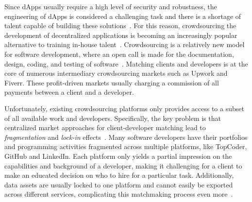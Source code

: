 Since dApps usually require a high level of security and robustness, the engineering of dApps is considered a challenging task and there is a shortage of talent capable of building these solutions~\cite{shortage2016nasdaq}.
For this reason, crowdsourcing the development of decentralized applications is becoming an increasingly popular alternative to training in-house talent~\cite{gong2021reference}.
Crowdsourcing is a relatively new model for software development, where an open call is made for the documentation, design, coding, and testing of software~\cite{latoza2016crowdsourcing}.
Matching clients and developers is at the core of numerous intermediary crowdsourcing markets such as Upwork and Fiverr.
These profit-driven markets usually charging a commission of all payments between a client and a developer.

Unfortunately, existing crowdsourcing platforms only provides access to a subset of all available work and developers.
Specifically, the key problem is that centralized market approaches for client-developer matching lead to \emph{fragmentation} and \emph{lock-in} effects~\cite{pouwelse2017laws,gong2021reference}.
Many software developers have their portfolios and programming activities fragmented across multiple platforms, like TopCoder, GitHub and LinkedIn.
Each platform only yields a partial impression on the capabilities and background of a developer, making it challenging for a client to make an educated decision on who to hire for a particular task.
Additionally, data assets are usually locked to one platform and cannot easily be exported across different services, complicating this matchmaking process even more~\cite{hesse2019reputation}.


